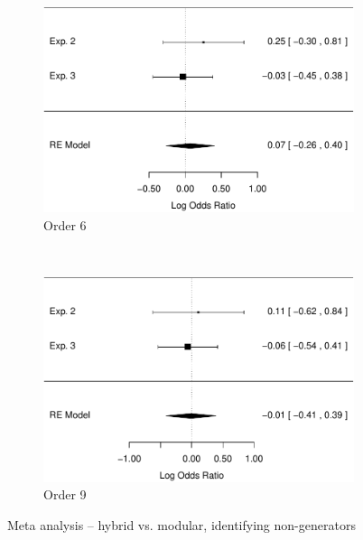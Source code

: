 \documentclass[man,10pt]{apa6}
\begin{document}
\begin{figure}
\centering
\begin{subfigure}[c]{0.4\textwidth}
\centering
\includegraphics[width=\textwidth]{figures/meta/question_typegenerator_false_6_conditionhybrid.pdf}
\caption{Order 6}
\end{subfigure}
~
\begin{subfigure}[c]{0.4\textwidth}
\centering
\includegraphics[width=\textwidth]{figures/meta/question_typegenerator_false_9_conditionhybrid.pdf}
\caption{Order 9}
\end{subfigure}
\caption{Meta analysis -- hybrid vs. modular, identifying non-generators}
\label{meta_genF_h}
\end{figure}\noindent 
\end{document}
